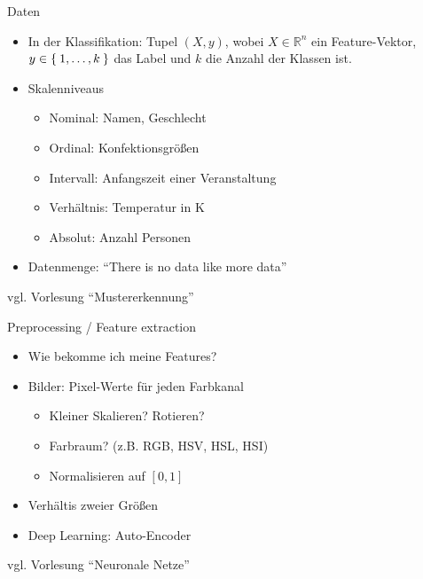 \begin{frame}{Daten}
    \begin{itemize}
        \item In der Klassifikation:
              Tupel $(X, y)$, wobei $X \in \mathbb{R}^n$ ein Feature-Vektor, $y \in \Set{1, \dots, k}$ das Label und $k$ die Anzahl der Klassen ist.
        \item Skalenniveaus
            \begin{itemize}
                \item Nominal: Namen, Geschlecht
                \item Ordinal: Konfektionsgrößen
                \item Intervall: Anfangszeit einer Veranstaltung
                \item Verhältnis: Temperatur in K
                \item Absolut: Anzahl Personen
            \end{itemize}
        \item Datenmenge: \enquote{There is no data like more data}
    \end{itemize}

    vgl. Vorlesung \enquote{Mustererkennung}
\end{frame}

\begin{frame}{Preprocessing / Feature extraction}
    \begin{itemize}
        \item Wie bekomme ich meine Features?
        \item Bilder: Pixel-Werte für jeden Farbkanal
        \begin{itemize}
            \item Kleiner Skalieren? Rotieren?
            \item Farbraum? (z.B. RGB, HSV, HSL, HSI)
            \item Normalisieren auf $[0, 1]$
        \end{itemize}
        \item Verhältis zweier Größen
        \item Deep Learning: Auto-Encoder
    \end{itemize}

    vgl. Vorlesung \enquote{Neuronale Netze}
\end{frame}

